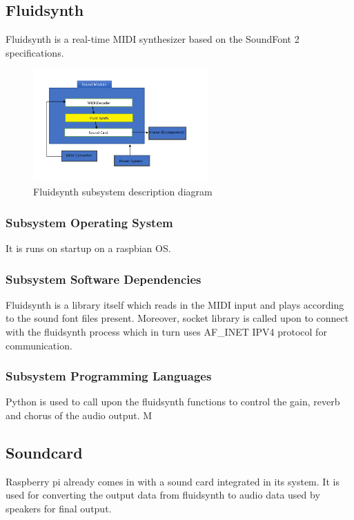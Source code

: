 \subsection{Fluidsynth}
Fluidsynth is a real-time MIDI synthesizer based on the SoundFont 2 specifications. 

\begin{figure}[h!]
	\centering
 	\includegraphics[width=0.60\textwidth]{images/fluidsynth.png}
 \caption{Fluidsynth subsystem description diagram}
\end{figure}

\subsubsection{Subsystem Operating System}
It is runs on startup on a raspbian OS.

\subsubsection{Subsystem Software Dependencies}
Fluidsynth is a library itself which reads in the MIDI input and plays according to the sound font files present. Moreover, socket library is called upon to connect with the fluidsynth process which in turn uses AF\_INET IPV4 protocol for communication.

\subsubsection{Subsystem Programming Languages}
Python is used to call upon the fluidsynth functions to control the gain, reverb and chorus of the audio output. M

\subsection{Soundcard}
Raspberry pi already comes in with a sound card integrated in its system. It is used for converting the output data from fluidsynth to audio data used by speakers for final output.

